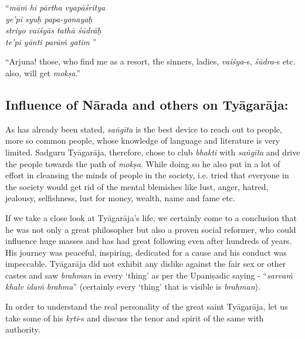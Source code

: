 \begin{centerquote}
“\textit{māṁ hi pārtha vyapāśritya}\\ \textit{ye’pi syuḥ papa-yonayaḥ }\\ \textit{striyo vaiśyās tathā śūdrāḥ} \\ \textit{te’pi yānti parāṁ gatim }”
\end{centerquote}

``Arjuna! those, who find me as a resort, the sinners, ladies, \textit{vaiśya}-s, \textit{śūdra}-s etc. also, will get \textit{mokṣa}.''


\subsection*{Influence of Nārada and others on Tyāgarāja:}

\vspace{-.3cm}

As has already been stated, \textit{saṅgīta} is the best device to reach out to people, more so common people, whose knowledge of language and literature is very limited. Sadguru Tyāgarāja, therefore, chose to club \textit{bhakti} with \textit{saṅgīta} and drive the people towards the path of \textit{mokṣa}. While doing so he also put in a lot of effort in cleansing the minds of people in the society, i.e. tried that everyone in the society would get rid of the mental blemishes like lust, anger, hatred, jealousy, selfishness, lust for money, wealth, name and fame etc. 

If we take a close look at Tyāgarāja’s life, we certainly come to a conclusion that he was not only a great philosopher but also a proven social reformer, who could influence huge masses and has had great following even after hundreds of years. His journey was peaceful, inspiring, dedicated for a cause and his conduct was impeccable. Tyāgarāja did not exhibit any dislike against the fair sex or other castes and saw \textit{brahman} in every ‘thing’ as per the Upaniṣadic saying - “\textit{sarvaṁ khalv idaṁ brahma}” (certainly every ‘thing’ that is visible is \textit{brahman}).

In order to understand the real personality of the great saint Tyāgarāja, let us take some of his \textit{kṛti}-s and discuss the tenor and spirit of the same with authority.

